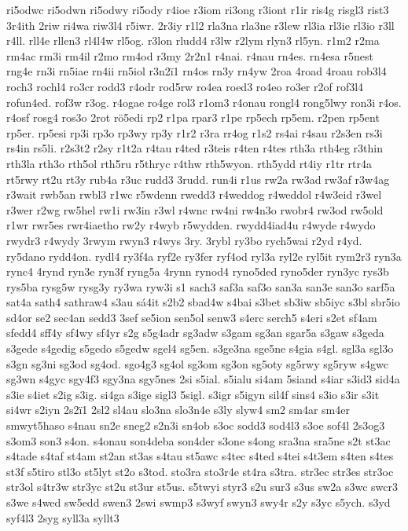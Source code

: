 {ri5odwc
ri5odwn
ri5odwy
ri5ody
r4ioe
r3iom
ri3ong
r3iont
r1ir
ris4g
risgl3
rist3
3r4ith
2riw
ri4wa
riw3l4
r5iwr.
2r3iy
r1l2
rla3na
rla3ne
r3lew
rl3ia
rl3ie
rl3io
r3ll
r4ll.
rll4e
rllen3
rl4l4w
rl5og.
r3lon
rludd4
r3lw
r2lym
rlyn3
rl5yn.
r1m2
r2ma
rm4ac
rm3i
rm4il
r2mo
rm4od
r3my
2r2n1
r4nai.
r4nau
rn4es.
rn4esa
r5nest
rng4e
rn3i
rn5iae
rn4ii
rn5iol
r3n2ï1
rn4os
rn3y
rn4yw
2roa
4road
4roau
rob3l4
roch3
rochl4
ro3cr
rodd3
r4odr
rod5rw
ro4ea
roed3
ro4eo
ro3er
r2of
rof3l4
rofun4ed.
rof3w
r3og.
r4ogae
ro4ge
rol3
r1om3
r4onau
rongl4
rong5lwy
ron3i
r4os.
r4osf
rosg4
ros3o
2rot
rö5edi
rp2
r1pa
rpar3
r1pe
rp5ech
rp5em.
r2pen
rp5ent
rp5er.
rp5esi
rp3i
rp3o
rp3wy
rp3y
r1r2
r3ra
rr4og
r1s2
rs4ai
r4sau
r2s3en
rs3i
rs4in
rs5li.
r2s3t2
r2sy
r1t2a
r4tau
r4ted
r3teis
r4ten
r4tes
rth3a
rth4eg
r3thin
rth3la
rth3o
rth5ol
rth5ru
r5thryc
r4thw
rth5wyon.
rth5ydd
rt4iy
r1tr
rtr4a
rt5rwy
rt2u
rt3y
rub4a
r3uc
rudd3
3rudd.
run4i
r1us
rw2a
rw3ad
rw3af
r3w4ag
r3wait
rwb5an
rwbl3
r1wc
r5wdenn
rwedd3
r4weddog
r4weddol
r4w3eid
r3wel
r3wer
r2wg
rw5hel
rw1i
rw3in
r3wl
r4wnc
rw4ni
rw4n3o
rwobr4
rw3od
rw5old
r1wr
rwr5es
rwr4iaetho
rw2y
r4wyb
r5wydden.
rwydd4iad4u
r4wyde
r4wydo
rwydr3
r4wydy
3rwym
rwyn3
r4wys
3ry.
3rybl
ry3bo
rych5wai
r2yd
r4yd.
ry5dano
rydd4on.
rydl4
ry3f4a
ryf2e
ry3fer
ryf4od
ryl3a
ryl2e
ryl5it
rym2r3
ryn3a
rync4
4rynd
ryn3e
ryn3f
ryng5a
4rynn
rynod4
ryno5ded
ryno5der
ryn3yc
rys3b
rys5ba
rysg5w
rysg3y
ry3wa
ryw3i
s1
sach3
saf3a
saf3o
san3a
san3e
san3o
sarf5a
sat4a
sath4
sathraw4
s3au
sá4it
s2b2
sbad4w
s4bai
s3bet
sb3iw
sb5iyc
s3bl
sbr5io
sd4or
se2
sec4an
sedd3
3sef
se5ion
sen5ol
senw3
s4erc
serch5
s4eri
s2et
sf4am
sfedd4
sff4y
sf4wy
sf4yr
s2g
s5g4adr
sg3adw
s3gam
sg3an
sgar5a
s3gaw
s3geda
s3gede
s4gedig
s5gedo
s5gedw
sgel4
sg5en.
s3ge3na
sge5ne
s4gia
s4gl.
sgl3a
sgl3o
s3gn
sg3ni
sg3od
sg4od.
sgo4g3
sg4ol
sg3om
sg3on
sg5oty
sg5rwy
sg5ryw
s4gwc
sg3wn
s4gyc
sgy4f3
sgy3na
sgy5nes
2si
s5ial.
s5ialu
si4am
5siand
s4iar
s3id3
sid4a
s3ie
s4iet
s2ig
s3ig.
si4ga
s3ige
sigl3
5sigl.
s3igr
s5igyn
sil4f
sins4
s3io
s3ir
s3it
si4wr
s2iyn
2s2ï1
2sl2
sl4au
slo3na
slo3n4e
s3ly
slyw4
sm2
sm4ar
sm4er
smwyt5haso
s4nau
sn2e
sneg2
s2n3i
sn4ob
s3oc
sodd3
sod4l3
s3oe
sof4l
2s3og3
s3om3
son3
s4on.
s4onau
son4deba
son4der
s3one
s4ong
sra3na
sra5ne
s2t
st3ac
s4tade
s4taf
st4am
st2an
st3as
s4tau
st5awc
s4tec
s4ted
s4tei
s4t3em
s4ten
s4tes
st3f
s5tiro
stl3o
st5lyt
st2o
s3tod.
sto3ra
sto3r4e
st4ra
s3tra.
str3ec
str3es
str3oc
str3ol
s4tr3w
str3yc
st2u
st3ur
st5us.
s5twyi
styr3
s2u
sur3
s3us
sw2a
s3wc
swcr3
s3we
s4wed
sw5edd
swen3
2swi
swmp3
s3wyf
swyn3
swy4r
s2y
s3yc
s5ych.
s3yd
syf4l3
2syg
syll3a
syllt3
}
